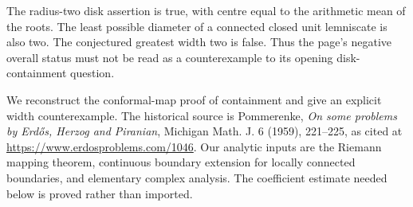 The radius-two disk assertion is true, with centre equal to the arithmetic mean of the roots. The least possible diameter of a connected closed unit lemniscate is also two. The conjectured greatest width two is false. Thus the page's negative overall status must not be read as a counterexample to its opening disk-containment question.

We reconstruct the conformal-map proof of containment and give an explicit width counterexample. The historical source is Pommerenke, \emph{On some problems by Erd\H{o}s, Herzog and Piranian}, Michigan Math. J. 6 (1959), 221--225, as cited at \url{https://www.erdosproblems.com/1046}. Our analytic inputs are the Riemann mapping theorem, continuous boundary extension for locally connected boundaries, and elementary complex analysis. The coefficient estimate needed below is proved rather than imported.
